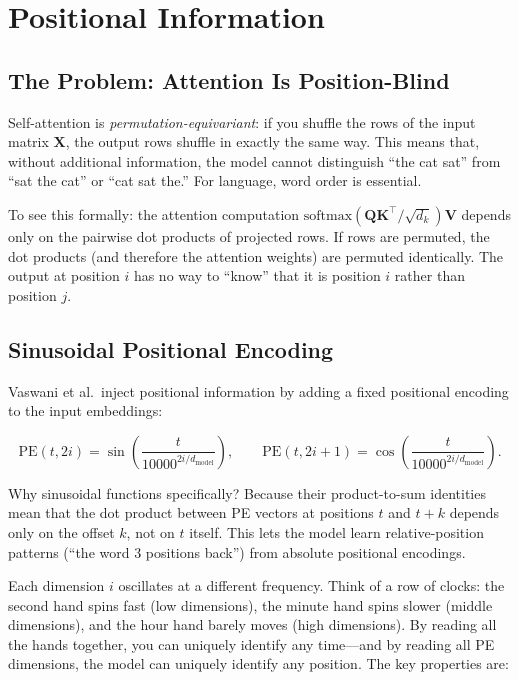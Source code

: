\section{Positional Information}

\subsection{The Problem: Attention Is Position-Blind}

Self-attention is \emph{permutation-equivariant}: if you shuffle the rows of the input matrix $\mathbf{X}$, the output rows shuffle in exactly the same way. This means that, without additional information, the model cannot distinguish ``the cat sat'' from ``sat the cat'' or ``cat sat the.'' For language, word order is essential.

To see this formally: the attention computation $\text{softmax}(\mathbf{Q}\mathbf{K}^\top / \sqrt{d_k})\mathbf{V}$ depends only on the pairwise dot products of projected rows. If rows are permuted, the dot products (and therefore the attention weights) are permuted identically. The output at position $i$ has no way to ``know'' that it is position $i$ rather than position $j$.

\subsection{Sinusoidal Positional Encoding}

Vaswani et al.\ inject positional information by adding a fixed positional encoding to the input embeddings:

\[
\text{PE}(t, 2i) = \sin\!\left(\frac{t}{10000^{2i/d_{\text{model}}}}\right), \qquad
\text{PE}(t, 2i+1) = \cos\!\left(\frac{t}{10000^{2i/d_{\text{model}}}}\right).
\]

Why sinusoidal functions specifically? Because their product-to-sum identities mean that the dot product between PE vectors at positions $t$ and $t{+}k$ depends only on the offset $k$, not on $t$ itself. This lets the model learn relative-position patterns (``the word 3 positions back'') from absolute positional encodings.

Each dimension $i$ oscillates at a different frequency. Think of a row of clocks: the second hand spins fast (low dimensions), the minute hand spins slower (middle dimensions), and the hour hand barely moves (high dimensions). By reading all the hands together, you can uniquely identify any time---and by reading all PE dimensions, the model can uniquely identify any position. The key properties are:

